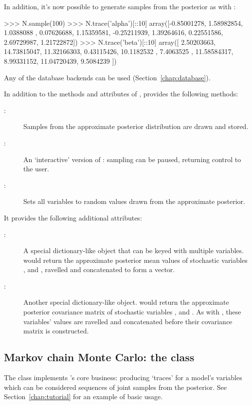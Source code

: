 \documentclass[]{jss}
\begin{document}
In addition, it's now possible to generate samples from the posterior as with :
\begin{CodeInput}
>>> N.sample(100)
>>> N.trace('alpha')[::10]
array([-0.85001278,  1.58982854,  1.0388088 ,  0.07626688,  1.15359581,
   -0.25211939,  1.39264616,  0.22551586,  2.69729987,  1.21722872])
>>> N.trace('beta')[::10]
array([  2.50203663,  14.73815047,  11.32166303,   0.43115426,
    10.1182532 ,   7.4063525 ,  11.58584317,   8.99331152,
    11.04720439,   9.5084239 ])
\end{CodeInput}
Any of the database backends can be used (Section~\ref{chap:database}).

\bigskip
In addition to the methods and attributes of ,  provides the following methods:
\begin{description}
    \item[:] Samples from the approximate posterior distribution are drawn and stored.
    \item[:] An `interactive' version of : sampling can be paused, returning control to the user.
    \item[:] Sets all variables to random values drawn from the approximate posterior.
\end{description}
It provides the following additional attributes:
\begin{description}
    \item[:] A special dictionary-like object that can be keyed with multiple variables.  would return the approximate posterior mean values of stochastic variables ,  and , ravelled and concatenated to form a vector.
    \item[:] Another special dictionary-like object.  would return the approximate posterior covariance matrix of stochastic variables ,  and . As with , these variables' values are ravelled and concatenated before their covariance matrix is constructed.
\end{description}

\subsection[Markov chain Monte Carlo: the MCMC class]{Markov chain Monte
Carlo: the  class} \label{sec:mcmc}

The  class implements 's core business: producing `traces' for a model's variables which can be considered sequences of joint samples from the posterior. See Section~\ref{chap:tutorial} for an example of basic usage.
\end{document}
